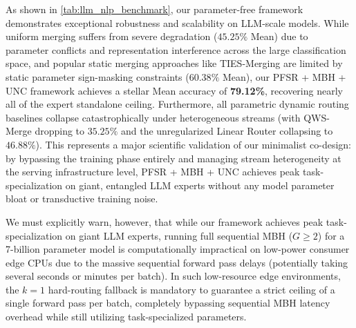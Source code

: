 As shown in \cref{tab:llm_nlp_benchmark}, our parameter-free framework demonstrates exceptional robustness and scalability on LLM-scale models. While uniform merging suffers from severe degradation ($45.25\%$ Mean) due to parameter conflicts and representation interference across the large classification space, and popular static merging approaches like TIES-Merging are limited by static parameter sign-masking constraints ($60.38\%$ Mean), our PFSR + MBH + UNC framework achieves a stellar Mean accuracy of \textbf{79.12\%}, recovering nearly all of the expert standalone ceiling. Furthermore, all parametric dynamic routing baselines collapse catastrophically under heterogeneous streams (with QWS-Merge dropping to $35.25\%$ and the unregularized Linear Router collapsing to $46.88\%$). This represents a major scientific validation of our minimalist co-design: by bypassing the training phase entirely and managing stream heterogeneity at the serving infrastructure level, PFSR + MBH + UNC achieves peak task-specialization on giant, entangled LLM experts without any model parameter bloat or transductive training noise.

We must explicitly warn, however, that while our framework achieves peak task-specialization on giant LLM experts, running full sequential MBH ($G \ge 2$) for a 7-billion parameter model is computationally impractical on low-power consumer edge CPUs due to the massive sequential forward pass delays (potentially taking several seconds or minutes per batch). In such low-resource edge environments, the $k=1$ hard-routing fallback is mandatory to guarantee a strict ceiling of a single forward pass per batch, completely bypassing sequential MBH latency overhead while still utilizing task-specialized parameters.

